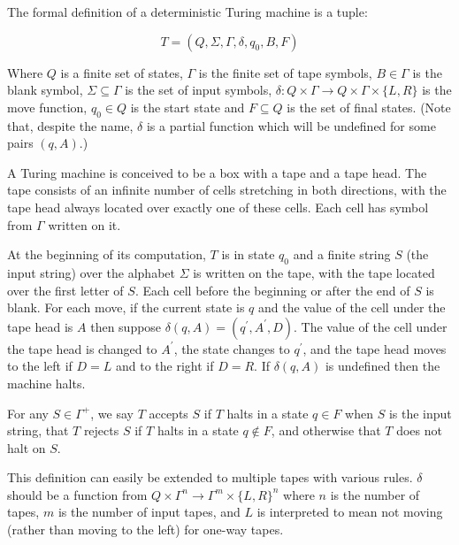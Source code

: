 \documentclass[12pt]{article}
\begin{document}
The formal definition of a deterministic Turing machine is a tuple:

$$T=(Q,\Sigma,\Gamma,\delta,q_0,B,F)$$

Where $Q$ is a finite set of states, $\Gamma$ is the finite set of tape symbols, $B\in\Gamma$ is the blank symbol, $\Sigma\subseteq\Gamma$ is the set of input symbols, $\delta:Q\times\Gamma\rightarrow Q\times\Gamma\times\{L,R\}$ is the move function, $q_0\in Q$ is the start state and $F\subseteq Q$ is the set of final states.  (Note that, despite the name, $\delta$ is a partial function which will be undefined for some pairs $(q,A)$.)

A Turing machine is conceived to be a box with a tape and a tape head.  The tape consists of an  infinite number of cells stretching in both directions, with the tape head always located over exactly one of these cells. Each cell has symbol from $\Gamma$ written on it.

At the beginning of its computation, $T$ is in state $q_0$ and a finite string $S$ (the input string) over the alphabet $\Sigma$ is written on the tape, with the tape located over the first letter of $S$.  Each cell before the beginning or after the end of $S$ is blank.  For each move, if the current state is $q$ and the value of the cell under the tape head is $A$ then suppose $\delta(q,A)=(q^\prime, A^\prime,D)$.  The value of the cell under the tape head is changed to $A^\prime$, the state changes to $q^\prime$, and the tape head moves to the left if $D=L$ and to the right if $D=R$.  If $\delta(q,A)$ is undefined then the machine halts.

For any $S\in\Gamma^+$, we say $T$ accepts $S$ if $T$ halts in a state $q\in F$ when $S$ is the input string, that $T$ rejects $S$ if $T$ halts in a state $q\not\in F$, and otherwise that $T$ does not halt on $S$.

This definition can easily be extended to multiple tapes with various rules.  $\delta$ should be a function from $Q\times\Gamma^n\rightarrow\Gamma^m\times\{L,R\}^n$ where $n$ is the number of tapes, $m$ is the number of input tapes, and $L$ is interpreted to mean not moving (rather than moving to the left) for one-way tapes.
\end{document}
